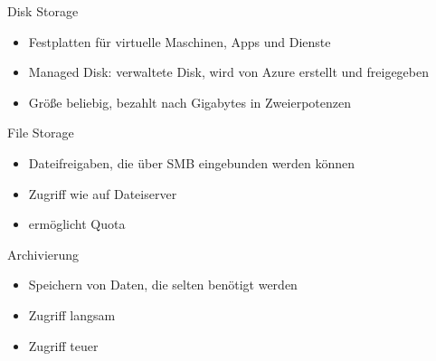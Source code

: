 \begin{flashcard}[Definition]{Disk Storage}
    \begin{itemize}
        \item Festplatten für virtuelle Maschinen, Apps und Dienste
        \item Managed Disk: verwaltete Disk, wird von Azure erstellt und freigegeben
        \item Größe beliebig, bezahlt nach Gigabytes in Zweierpotenzen
    \end{itemize}
\end{flashcard}

\begin{flashcard}[Definition]{File Storage}
    \begin{itemize}
        \item Dateifreigaben, die über SMB eingebunden werden können
        \item Zugriff wie auf Dateiserver
        \item ermöglicht Quota
    \end{itemize}
\end{flashcard}

\begin{flashcard}[Definition]{Archivierung}
    \begin{itemize}
        \item Speichern von Daten, die selten benötigt werden
        \item Zugriff langsam
        \item Zugriff teuer
    \end{itemize}
\end{flashcard}

